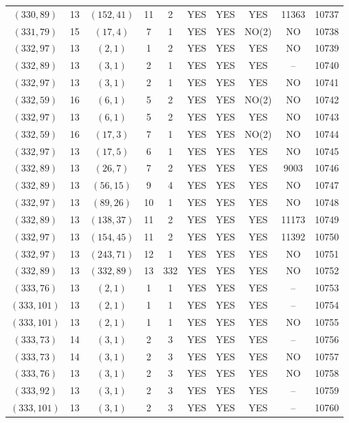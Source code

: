 \begin{longtable}{|c|c|c|c|c|c|c|c|c|c|}
$(330, 89)$ & 13 & $(152, 41)$ & 11 & 2 & YES & YES & YES & 11363 & 10737\\
$(331, 79)$ & 15 & $(17, 4)$ & 7 & 1 & YES & YES & NO(2) & NO & 10738\\
$(332, 97)$ & 13 & $(2, 1)$ & 1 & 2 & YES & YES & YES & NO & 10739\\
$(332, 89)$ & 13 & $(3, 1)$ & 2 & 1 & YES & YES & YES & -- & 10740\\
$(332, 97)$ & 13 & $(3, 1)$ & 2 & 1 & YES & YES & YES & NO & 10741\\
$(332, 59)$ & 16 & $(6, 1)$ & 5 & 2 & YES & YES & NO(2) & NO & 10742\\
$(332, 97)$ & 13 & $(6, 1)$ & 5 & 2 & YES & YES & YES & NO & 10743\\
$(332, 59)$ & 16 & $(17, 3)$ & 7 & 1 & YES & YES & NO(2) & NO & 10744\\
$(332, 97)$ & 13 & $(17, 5)$ & 6 & 1 & YES & YES & YES & NO & 10745\\
$(332, 89)$ & 13 & $(26, 7)$ & 7 & 2 & YES & YES & YES & 9003 & 10746\\
$(332, 89)$ & 13 & $(56, 15)$ & 9 & 4 & YES & YES & YES & NO & 10747\\
$(332, 97)$ & 13 & $(89, 26)$ & 10 & 1 & YES & YES & YES & NO & 10748\\
$(332, 89)$ & 13 & $(138, 37)$ & 11 & 2 & YES & YES & YES & 11173 & 10749\\
$(332, 97)$ & 13 & $(154, 45)$ & 11 & 2 & YES & YES & YES & 11392 & 10750\\
$(332, 97)$ & 13 & $(243, 71)$ & 12 & 1 & YES & YES & YES & NO & 10751\\
$(332, 89)$ & 13 & $(332, 89)$ & 13 & 332 & YES & YES & YES & NO & 10752\\
$(333, 76)$ & 13 & $(2, 1)$ & 1 & 1 & YES & YES & YES & -- & 10753\\
$(333, 101)$ & 13 & $(2, 1)$ & 1 & 1 & YES & YES & YES & -- & 10754\\
$(333, 101)$ & 13 & $(2, 1)$ & 1 & 1 & YES & YES & YES & NO & 10755\\
$(333, 73)$ & 14 & $(3, 1)$ & 2 & 3 & YES & YES & YES & -- & 10756\\
$(333, 73)$ & 14 & $(3, 1)$ & 2 & 3 & YES & YES & YES & NO & 10757\\
$(333, 76)$ & 13 & $(3, 1)$ & 2 & 3 & YES & YES & YES & NO & 10758\\
$(333, 92)$ & 13 & $(3, 1)$ & 2 & 3 & YES & YES & YES & -- & 10759\\
$(333, 101)$ & 13 & $(3, 1)$ & 2 & 3 & YES & YES & YES & -- & 10760\\

\end{longtable}
